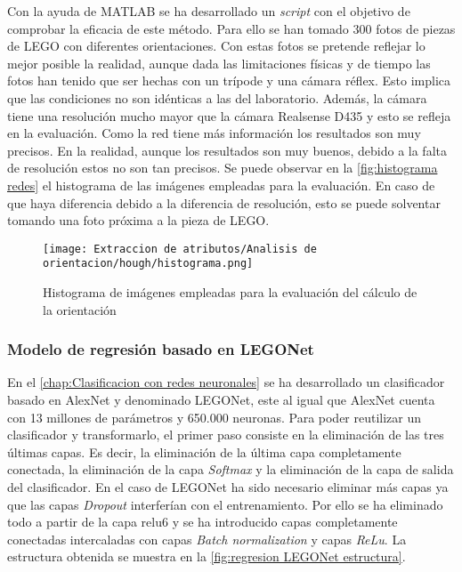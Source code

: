 Con la ayuda de MATLAB se ha desarrollado un \textit{script} con el objetivo de comprobar la eficacia de este método. Para ello se han tomado 300 fotos de piezas de LEGO con diferentes orientaciones. Con estas fotos se pretende reflejar lo mejor posible la realidad, aunque dada las limitaciones físicas y de tiempo las fotos han tenido que ser hechas con un trípode y una cámara réflex. Esto implica que las condiciones no son idénticas a las del laboratorio. Además, la cámara tiene una resolución mucho mayor que la cámara Realsense D435 y esto se refleja en la evaluación. Como la red tiene más información los resultados son muy precisos. En la realidad, aunque los resultados son muy buenos, debido a la falta de resolución estos no son tan precisos. Se puede observar en la \autoref{fig:histograma redes} el histograma de las imágenes empleadas para la evaluación. En caso de que haya diferencia debido a la diferencia de resolución, esto se puede solventar tomando una foto próxima a la pieza de LEGO.

\begin{figure}[ht] %
	\centering
	\texttt{[image: Extraccion de atributos/Analisis de orientacion/hough/histograma.png]}
	\caption[Histograma de imágenes rotadas empleadas para evaluación]{Histograma de imágenes empleadas para la evaluación del cálculo de la orientación}
	\label{fig:histograma redes}
	\vspace{-5pt}
\end{figure}

\subsubsection*{Modelo de regresión basado en LEGONet}
En el \autoref{chap:Clasificacion con redes neuronales} se ha desarrollado un clasificador basado en AlexNet y denominado LEGONet, este al igual que AlexNet cuenta con 13 millones de parámetros y 650.000 neuronas. Para poder reutilizar un clasificador y transformarlo, el primer paso consiste en la eliminación de las tres últimas capas. Es decir, la eliminación de la última capa completamente conectada, la eliminación de la capa \textit{Softmax} y la eliminación de la capa de salida del clasificador. En el caso de LEGONet ha sido necesario eliminar más capas ya que las capas \textit{Dropout} interferían con el entrenamiento. Por ello se ha eliminado todo a partir de la capa relu6 y se ha introducido capas completamente conectadas intercaladas con capas \textit{Batch normalization} y capas \textit{ReLu}. La estructura obtenida se muestra en la \autoref{fig:regresion LEGONet estructura}.

